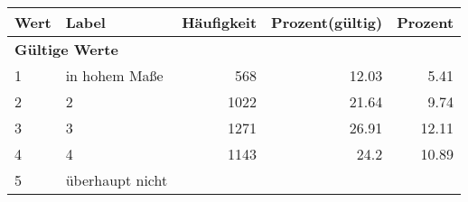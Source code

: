      \begin{longtable}{lXrrr}
     \toprule
     \textbf{Wert} & \textbf{Label} & \textbf{Häufigkeit} & \textbf{Prozent(gültig)} & \textbf{Prozent} \\
     \endhead
     \midrule
     \multicolumn{5}{l}{\textbf{Gültige Werte}}\\

     1 &
     \multicolumn{1}{X}{ in hohem Maße   } &


       \num{568} &
       \num[round-mode=places,round-precision=2]{12.03} &
         \num[round-mode=places,round-precision=2]{5.41} \\

     2 &
     \multicolumn{1}{X}{ 2   } &


       \num{1022} &
       \num[round-mode=places,round-precision=2]{21.64} &
         \num[round-mode=places,round-precision=2]{9.74} \\

     3 &
     \multicolumn{1}{X}{ 3   } &


       \num{1271} &
       \num[round-mode=places,round-precision=2]{26.91} &
         \num[round-mode=places,round-precision=2]{12.11} \\

     4 &
     \multicolumn{1}{X}{ 4   } &


       \num{1143} &
       \num[round-mode=places,round-precision=2]{24.2} &
         \num[round-mode=places,round-precision=2]{10.89} \\

     5 &
     \multicolumn{1}{X}{ überhaupt nicht   } &



\end{longtable}
